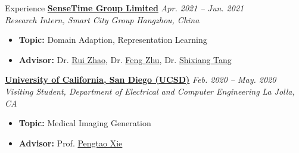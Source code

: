 \documentclass[a4paper]{resume} %
\begin{document}
\begin{rSection}{Experience}
 {\bf \href{https://www.sensetime.com/en}{SenseTime Group Limited}} \hfill{\it Apr. 2021 -- Jun. 2021}\\
 {\it Research Intern, Smart City Group} \hfill{\it Hangzhou, China}
 \begin{itemize}
     \item {\bf Topic:} Domain Adaption, Representation Learning
  	\item {\bf Advisor:} Dr. \href{http://zhaorui.xyz/}{Rui Zhao}, Dr. \href{https://zhufengx.github.io/}{Feng Zhu}, Dr. \href{https://scholar.google.com.tw/citations?user=TJ4ihdkAAAAJ}{Shixiang Tang}
 \end{itemize}


{\bf \href{https://ucsd.edu}{University of California, San Diego (UCSD)}} \hfill{\it Feb. 2020 -- May. 2020}\\
{\it Visiting Student, Department of Electrical and Computer Engineering} \hfill{\it La Jolla, CA}
\begin{itemize}
    \item {\bf Topic:} Medical Imaging Generation
    \item {\bf Advisor:} Prof. \href{https://sites.google.com/site/pengtaoxie2008}{Pengtao Xie}
\end{itemize}

\end{rSection}
\end{document}

